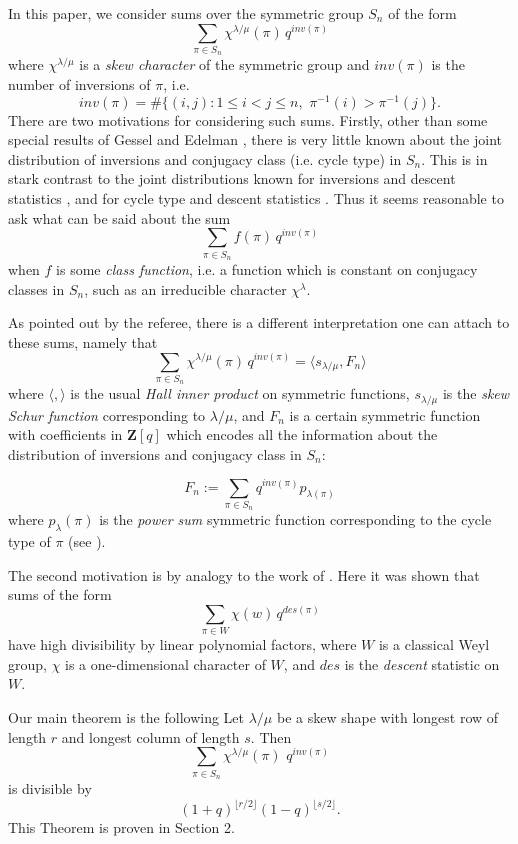 \newpage

In this paper, we consider sums over the symmetric group $S_n$
of the form
 $$\sum_{\pi \in S_n} \chi^{\lambda/\mu}(\pi) \, q^{inv(\pi)}$$
where $\chi^{\lambda/\mu}$ is a {\it skew character} of the symmetric group
\cite{JP} and $inv(\pi)$ is the number of inversions of $\pi$,
i.e.
$$inv(\pi) = \#\{(i,j): 1 \leq  i < j \leq n , 
                  \,\, \pi^{-1}(i) > \pi^{-1}(j) \}.$$
There are two motivations for considering such sums.  Firstly, other
than some special results of Gessel \cite{Ge} and Edelman
\cite{Ed}, there is very little known about the
joint distribution of inversions and conjugacy class (i.e. cycle type)
in $S_n$.  This is in stark contrast to the joint distributions
known for inversions and descent statistics \cite{GaGe}, and for
cycle type and descent statistics \cite {GR}.  Thus it seems reasonable to ask what can be said about the sum
 $$\sum_{\pi \in S_n} f(\pi) \, q^{inv(\pi)}$$
when $f$ is some {\it class function}, i.e. a function which
is constant on conjugacy classes in $S_n$, such as an irreducible
character $\chi^{\lambda}$.

 As pointed out by the referee,
there is a different interpretation one can attach to these
sums, namely that
$$\sum_{\pi \in S_n} \chi^{\lambda/\mu}(\pi) \, q^{inv(\pi)}
= \langle s_{\lambda/\mu}, F_n \rangle$$
where $\langle, \rangle$ is the  usual 
{\it Hall inner product} on symmetric functions, $s_{\lambda/\mu}$
is the {\it skew Schur function} corresponding to $\lambda/\mu$,
and $F_n$ is a certain symmetric function with coefficients in {\bf Z}$[q]$
which encodes all the information about the distribution of inversions
and conjugacy class in $S_n$:

$$
F_n:=\sum_{\pi \in S_n} q^{inv(\pi)} p_{\lambda(\pi)}
$$
where $p_\lambda(\pi)$ is the {\it power sum} symmetric function
corresponding to the cycle type of $\pi$ (see \cite{Mac}).
\endrem

  The second motivation
is by analogy to the work of \cite{DF,Re}.  Here it was shown
that sums of the form
$$ \sum_{\pi \in W} \chi(w) \, q^{des(\pi)}$$
have high divisibility by linear polynomial factors,
where $W$ is a classical Weyl group, $\chi$ is a one-dimensional
character of $W$, and $des$ is the {\it descent} statistic on $W$.
 
Our main theorem is the following
Let $\lambda/\mu$ be a skew shape with longest row of length $r$
and longest column of length $s$.  Then 
$$\sum_{\pi \in S_n} \chi^{\lambda/\mu}(\pi) \,\, q^{inv(\pi)} $$
is divisible by 
$$(1+q)^{\lfloor r/2 \rfloor}
  (1-q)^{\lfloor s/2 \rfloor}.$$
\endproclaim
This Theorem is proven in Section 2.

